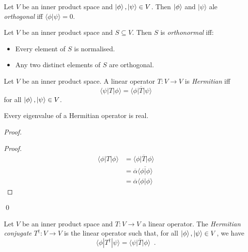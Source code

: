 \begin{df}[Orthogonal]
Let $V$ be an inner product space and $\left| {\phi} \right\rangle, |\psi\rangle \in V$. Then $\left| {\phi} \right\rangle$ and $|\psi\rangle$ ale \emph{orthogonal} iff $\langle \phi | \psi \rangle = 0$.
\end{df} 

\begin{df}[Orthonormal]
Let $V$ be an inner product space and $S \subseteq V$. Then $S$ is \emph{orthonormal} iff:
\begin{itemize}
\item Every element of $S$ is normalised.
\item Any two distinct elements of $S$ are orthogonal.
\end{itemize}
\end{df}

\begin{df}[Hermitian]
Let $V$ be an inner product space. A linear operator $T : V \rightarrow V$ is \emph{Hermitian} iff
\[ \langle \psi | T | \phi \rangle = \overline{\langle \phi | T | \psi \rangle} \]
for all $\left| {\phi} \right\rangle, \left| {\psi} \right\rangle \in V$.
\end{df}

\begin{prop}
Every eigenvalue of a Hermitian operator is real.
\end{prop}

\begin{proof}
\pf
{}
\begin{proof}
	\pf
	\begin{align*}
		\langle \phi | T | \phi \rangle & = \overline{\langle \phi | T | \phi \rangle} \\
		& = \overline{\alpha} \overline{\langle \phi | \phi \rangle} \\
		& = \overline{\alpha} \langle \phi | \phi \rangle
	\end{align*}
\end{proof}
\qed
\end{proof}

\begin{df}
Let $V$ be an inner product space and $T : V \rightarrow V$ a linear operator. The \emph{Hermitian conjugate} $T^\dagger : V \rightarrow V$ is the linear operator such that, for all $\left| {\phi} \right\rangle, \left| {\psi} \right\rangle \in V$, we have
\[ \langle \phi | T^\dagger | \psi \rangle = \overline{\langle \psi | T | \phi \rangle} \enspace . \]
\end{df}

